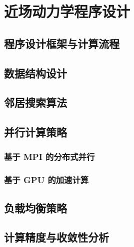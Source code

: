 \chapter{近场动力学程序设计}

\section{程序设计框架与计算流程}

\section{数据结构设计}

\section{邻居搜索算法}

\section{并行计算策略}
\subsection{基于 MPI 的分布式并行}
\subsection{基于 GPU 的加速计算}

\section{负载均衡策略}

\section{计算精度与收敛性分析}
